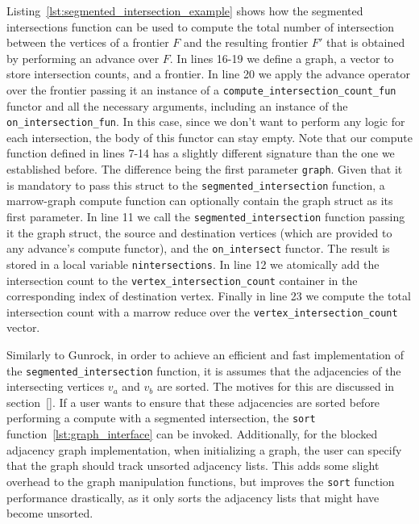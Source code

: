 Listing~\ref{lst:segmented_intersection_example} shows how the segmented intersections function can be used to compute the total number of intersection between the vertices of a frontier $F$ and the resulting frontier $F'$ that is obtained by performing an advance over $F$. In lines 16-19 we define a graph, a vector to store intersection counts, and a frontier. In line 20 we apply the advance operator over the frontier passing it an instance of a \texttt{compute\_intersection\_count\_fun} functor and all the necessary arguments, including an instance of the \texttt{on\_intersection\_fun}.  In this case, since we don't want to perform any logic for each intersection, the body of this functor can stay empty. Note that our compute function defined in lines 7-14 has a slightly different signature than the one we established before. The difference being the first  parameter \texttt{graph}. Given that it is mandatory to pass this struct to the \texttt{segmented\_intersection} function, a marrow-graph compute function can optionally contain the graph struct as its first parameter. In line 11 we call the \texttt{segmented\_intersection} function passing it the graph struct, the source and destination vertices (which are provided to any advance's compute functor), and the \texttt{on\_intersect} functor. The result is stored in a local variable \texttt{nintersections}. In line 12 we atomically add the intersection count to the \texttt{vertex\_intersection\_count} container in the corresponding index of destination vertex. Finally in line 23 we compute the total intersection count with a marrow reduce over the \texttt{vertex\_intersection\_count} vector.

Similarly to Gunrock, in order to achieve an efficient and fast implementation of the \texttt{segmented\_intersection} function, it is assumes that the adjacencies of the intersecting vertices $v_a$ and $v_b$ are sorted. The motives for this are discussed in section~\ref{}. If a user wants to ensure that these adjacencies are sorted before performing a compute with a segmented intersection, the \texttt{sort} function~\ref{lst:graph_interface} can be invoked. Additionally, for the blocked adjacency graph implementation, when initializing a graph, the user can specify that the graph should track unsorted adjacency lists. This adds some slight overhead to the graph manipulation functions, but improves the \texttt{sort} function performance drastically, as it only sorts the adjacency lists that might have become unsorted.

